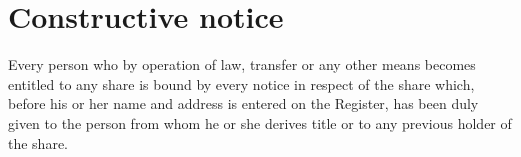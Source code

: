\section{Constructive notice}

Every person who by operation of law, transfer or any other means becomes entitled to any share is bound by every notice in respect of the share which, before his or her name and address is entered on the Register, has been duly given to the person from whom he or she derives title or to any previous holder of the share. 